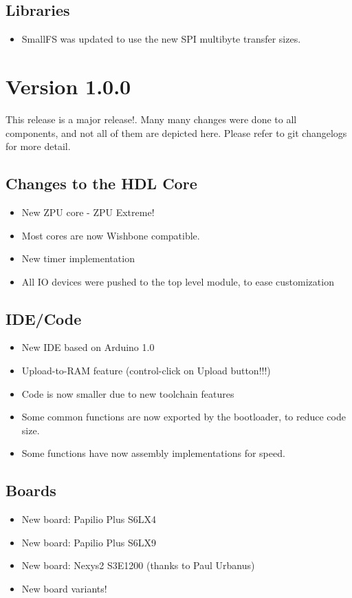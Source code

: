 \subsection*{Libraries}
\begin{itemize}
\item SmallFS was updated to use the new SPI multibyte transfer sizes.
\end{itemize}

\section{Version 1.0.0}

This release is a major release!. Many many changes were done to all components, and not all of them are
depicted here. Please refer to git changelogs for more detail.

\subsection*{Changes to the HDL Core}

\begin{itemize}
\item New ZPU core - ZPU Extreme!
\item Most cores are now Wishbone compatible.
\item New timer implementation 
\item All IO devices were pushed to the top level module, to ease customization 
\end{itemize}

\subsection*{IDE/Code}

\begin{itemize}
 \item New IDE based on Arduino 1.0
 \item Upload-to-RAM feature (control-click on Upload button!!!)
 \item Code is now smaller due to new toolchain features
 \item Some common functions are now exported by the bootloader, to reduce code size.
 \item Some functions have now assembly implementations for speed.
\end{itemize}

\subsection*{Boards}
\begin{itemize}
 \item New board: Papilio Plus S6LX4
 \item New board: Papilio Plus S6LX9
 \item New board: Nexys2 S3E1200 (thanks to Paul Urbanus)
 \item New board variants!
\end{itemize}

